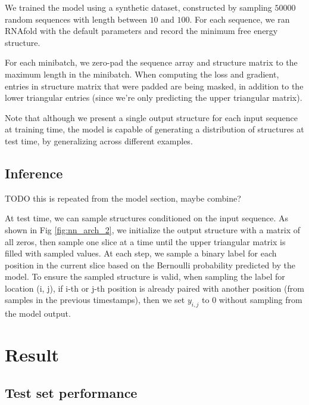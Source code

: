 \documentclass{article}
\begin{document}
We trained the model using a synthetic dataset, constructed by sampling $50000$ random sequences with length
between $10$ and $100$.
For each sequence, we ran RNAfold\cite{lorenz2011viennarna} with the default parameters and
record the minimum free energy structure.

For each minibatch, we zero-pad the sequence array and structure matrix to the maximum length in the minibatch.
When computing the loss and gradient, entries in structure matrix that were padded are being masked,
in addition to the lower triangular entries (since we're only predicting the upper triangular matrix).

Note that although we present a single output structure for each input sequence at training time,
the model is capable of generating a distribution of structures at test time, by generalizing across different examples.






\subsection{Inference}

TODO this is repeated from the model section, maybe combine?

At test time, we can sample structures conditioned on the input sequence.
As shown in Fig \ref{fig:nn_arch_2}, we initialize the output structure with a matrix of all zeros,
then sample one slice at a time until the upper triangular matrix is filled with sampled values.
At each step, we sample a binary label for each position in the current slice based on the
Bernoulli probability predicted by the model.
To ensure the sampled structure is valid, when sampling the label for location (i, j),
if i-th or j-th position is already paired with another position (from samples in the previous timestamps),
then we set $y_{i, j}$ to $0$ without sampling from the model output.

\section{Result}



\subsection{Test set performance}
\end{document}
